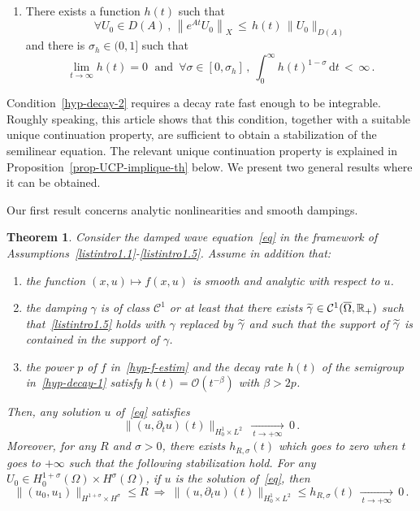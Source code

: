 \documentclass[10pt]{amsart}
\newtheorem{theo}{Theorem}[section]
\theoremstyle{definition}\newtheorem{defi}[theo]{Definition}\newtheorem{rema}[theo]{Remark}\newtheorem{exam}[theo]{Example}\newtheorem{exem}[theo]{Example}\newtheorem{nota}[theo]{Notation}
\newcommand{\RR}{\mathbb{R}}
\newcommand{\Cc}{\mathcal{C}}
\newcommand{\Oc}{\mathcal{O}}
\newcommand{\drm}{\mathrm{d}}
\newcommand*{\romanenumi}{\renewcommand*{\theenumi}{\roman{enumi}}}
\newcommand*{\alphenumi}{\renewcommand*{\theenumi}{\alph{enumi}}}
\let\oldtilde\tilde
\renewcommand*{\tilde}[1]{\mathchoice{\widetilde{#1}}{\widetilde{#1}}{\oldtilde{#1}}{\oldtilde{#1}}}\let\oldexists\exists
\renewcommand*{\exists}{\mathrel{\oldexists}}
\let\oldforall\forall
\renewcommand*{\forall}{\mathrel{\oldforall}}
\begin{document}
\begingroup
\begin{enumerate}\romanenumi
\setcounter{enumi}{4}
\item \label{listintro1.5}There exists a function $h(t)$ such that
\begin{equation}\label{hyp-decay-1}
\forall U_0\in D(A)\,,\,\left\|e^{At}U_0\right\|_X \, \leq \, h(t)\,\|U_0\|_{D(A)}
\end{equation}
and there is $\sigma_h\in(0,1]$ such that
\begin{equation}\label{hyp-decay-2}
\lim_{t\rightarrow \infty}h(t)=0\;\text{ and }\,
\forall \sigma\in[0,\sigma_h]\,,\:\int_0^\infty h(t)^{1-\sigma}\,\drm t\,<\,\infty\,.
\end{equation}
\end{enumerate}
\endgroup
Condition~\eqref{hyp-decay-2} requires a decay rate fast enough to be integrable. Roughly speaking, this article shows that this condition, together with a suitable unique continuation property, are sufficient to obtain a stabilization of the semilinear equation. The relevant unique continuation property is explained in Proposition~\ref{prop-UCP-implique-th} below. We present two general results where it can be obtained.

Our first result concerns analytic nonlinearities and smooth dampings.


\begin{theo}\label{th1}
Consider the damped wave equation~\eqref{eq} in the framework of Assumptions~\eqref{listintro1.1}-\eqref{listintro1.5}. Assume in addition that:
\begin{enumerate}\alphenumi
\item \label{listtheo1.1.1}the function $(x,u)\mapsto f(x,u)$ is smooth and analytic with respect to $u$.
\item \label{listtheo1.1.2}the damping $\gamma$ is of class $\Cc^1$ or at least that there exists $\tilde\gamma\in\Cc^1(\overline\Omega,\RR_+)$ such that~\eqref{listintro1.5} holds with $\gamma$ replaced by $\tilde\gamma$ and such that the support of $\tilde\gamma$ is contained in the support of $\gamma$.
\item \label{listtheo1.1.3}the power $p$ of $f$ in~\eqref{hyp-f-estim} and the decay rate $h(t)$ of the semigroup in~\eqref{hyp-decay-1} satisfy $h(t)=\Oc(t^{-\beta})$ with $\beta>2p$.
\end{enumerate}
Then, any solution $u$ of~\eqref{eq} satisfies
\[
\|(u,\partial_t u)(t)\|_{H^1_0\times L^2}\,\xrightarrow[\:t\longrightarrow
+\infty\:]{}\,0\,.
\]
Moreover, for any $R$ and $\sigma>0$, there exists $h_{R,\sigma}(t)$ which goes to zero when $t$ goes to $+\infty$ such that the following stabilization hold. For any $U_0\in H^{1+\sigma}_0(\Omega)\times H^\sigma(\Omega)$, if $u$ is the solution of~\eqref{eq}, then
\[
\|(u_0,u_1)\|_{H^{1+\sigma}\times H^\sigma}\leq
R\:\Longrightarrow\:\|(u,\partial_t u)(t)\|_{H^1_0\times L^2} \leq
h_{R,\sigma}(t)\,\xrightarrow[\:t\longrightarrow +\infty\:]{}\,0\,.
\]
\end{theo}
\end{document}

